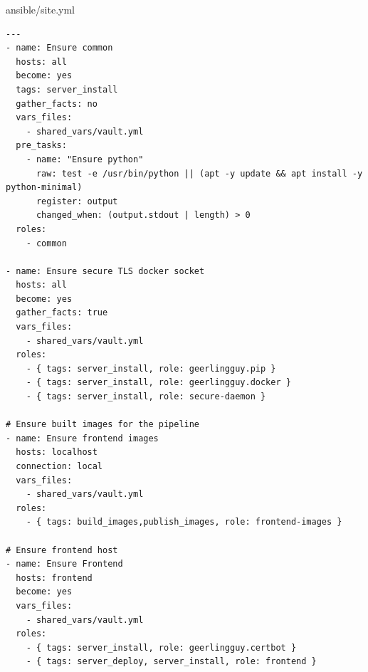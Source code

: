ansible/site.yml
\begin{verbatim}
---
- name: Ensure common
  hosts: all
  become: yes
  tags: server_install
  gather_facts: no
  vars_files:
    - shared_vars/vault.yml
  pre_tasks:
    - name: "Ensure python"
      raw: test -e /usr/bin/python || (apt -y update && apt install -y python-minimal)
      register: output
      changed_when: (output.stdout | length) > 0
  roles:
    - common

- name: Ensure secure TLS docker socket
  hosts: all
  become: yes
  gather_facts: true
  vars_files:
    - shared_vars/vault.yml
  roles:
    - { tags: server_install, role: geerlingguy.pip }
    - { tags: server_install, role: geerlingguy.docker }
    - { tags: server_install, role: secure-daemon }

# Ensure built images for the pipeline
- name: Ensure frontend images
  hosts: localhost
  connection: local
  vars_files:
    - shared_vars/vault.yml
  roles:
    - { tags: build_images,publish_images, role: frontend-images }

# Ensure frontend host
- name: Ensure Frontend
  hosts: frontend
  become: yes
  vars_files:
    - shared_vars/vault.yml
  roles:
    - { tags: server_install, role: geerlingguy.certbot }
    - { tags: server_deploy, server_install, role: frontend }
\end{verbatim}

